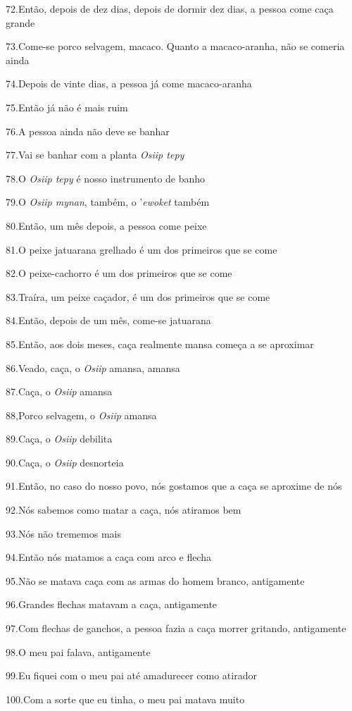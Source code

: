 72.Então, depois de dez dias, depois de dormir dez dias, a pessoa come
caça grande

73.Come-se porco selvagem, macaco. Quanto a macaco-aranha, não se
comeria ainda

74.Depois de vinte dias, a pessoa já come macaco-aranha

75.Então já não é mais ruim

76.A pessoa ainda não deve se banhar

77.Vai se banhar com a planta \emph{Osiip tepy}

78.O \emph{Osiip tepy} é nosso instrumento de banho

79.O \emph{Osiip mynan}, também, o '\emph{ewoket} também

80.Então, um mês depois, a pessoa come peixe

81.O peixe jatuarana grelhado é um dos primeiros que se come

82.O peixe-cachorro é um dos primeiros que se come

83.Traíra, um peixe caçador, é um dos primeiros que se come

84.Então, depois de um mês, come-se jatuarana

85.Então, aos dois meses, caça realmente mansa começa a se aproximar

86.Veado, caça, o \emph{Osiip} amansa, amansa

87.Caça, o \emph{Osiip} amansa

88,Porco selvagem, o \emph{Osiip} amansa

89.Caça, o \emph{Osiip} debilita

90.Caça, o \emph{Osiip} desnorteia

91.Então, no caso do nosso povo, nós gostamos que a caça se aproxime de
nós

92.Nós sabemos como matar a caça, nós atiramos bem

93.Nós não trememos mais

94.Então nós matamos a caça com arco e flecha

95.Não se matava caça com as armas do homem branco, antigamente

96.Grandes flechas matavam a caça, antigamente

97.Com flechas de ganchos, a pessoa fazia a caça morrer gritando,
antigamente

98.O meu pai falava, antigamente

99.Eu fiquei com o meu pai até amadurecer como atirador

100.Com a sorte que eu tinha, o meu pai matava muito


